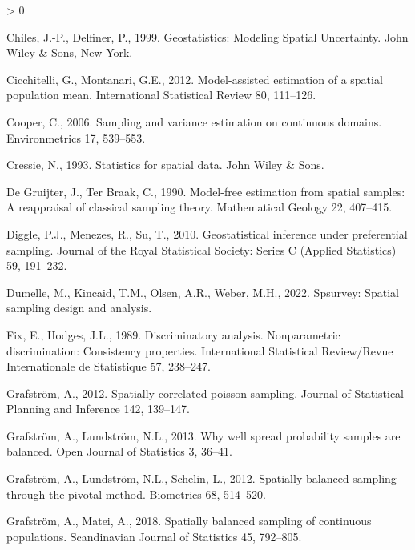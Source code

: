 \documentclass[]{elsarticle} %
\newlength{\cslhangindent}
\newenvironment{CSLReferences}[2] %
 {%
  \setlength{\parindent}{0pt}
  \ifodd #1 \everypar{\setlength{\hangindent}{\cslhangindent}}\ignorespaces\fi
  \ifnum #2 > 0
  \setlength{\parskip}{#2\baselineskip}
  \fi
 }%
 {}
\begin{document}
\begin{CSLReferences}{1}{0}
\leavevmode\hypertarget{ref-chiles1999geostatistics}{}%
Chiles, J.-P., Delfiner, P., 1999. Geostatistics: {Modeling Spatial
Uncertainty}. {John Wiley \& Sons}, New York.

\leavevmode\hypertarget{ref-cicchitelli2012model}{}%
Cicchitelli, G., Montanari, G.E., 2012. Model-assisted estimation of a
spatial population mean. International Statistical Review 80, 111--126.

\leavevmode\hypertarget{ref-cooper2006sampling}{}%
Cooper, C., 2006. Sampling and variance estimation on continuous
domains. Environmetrics 17, 539--553.

\leavevmode\hypertarget{ref-cressie1993statistics}{}%
Cressie, N., 1993. Statistics for spatial data. John Wiley \& Sons.

\leavevmode\hypertarget{ref-de1990model}{}%
De Gruijter, J., Ter Braak, C., 1990. Model-free estimation from spatial
samples: A reappraisal of classical sampling theory. Mathematical
Geology 22, 407--415.

\leavevmode\hypertarget{ref-diggle2010geostatistical}{}%
Diggle, P.J., Menezes, R., Su, T., 2010. Geostatistical inference under
preferential sampling. Journal of the Royal Statistical Society: Series
C (Applied Statistics) 59, 191--232.

\leavevmode\hypertarget{ref-dumelle2022spsurvey}{}%
Dumelle, M., Kincaid, T.M., Olsen, A.R., Weber, M.H., 2022. Spsurvey:
Spatial sampling design and analysis.

\leavevmode\hypertarget{ref-fix1989discriminatory}{}%
Fix, E., Hodges, J.L., 1989. Discriminatory analysis. Nonparametric
discrimination: Consistency properties. International Statistical
Review/Revue Internationale de Statistique 57, 238--247.

\leavevmode\hypertarget{ref-grafstrom2012spatiallypoisson}{}%
Grafström, A., 2012. Spatially correlated poisson sampling. Journal of
Statistical Planning and Inference 142, 139--147.

\leavevmode\hypertarget{ref-grafstrom2013well}{}%
Grafström, A., Lundström, N.L., 2013. Why well spread probability
samples are balanced. Open Journal of Statistics 3, 36--41.

\leavevmode\hypertarget{ref-grafstrom2012spatially}{}%
Grafström, A., Lundström, N.L., Schelin, L., 2012. Spatially balanced
sampling through the pivotal method. Biometrics 68, 514--520.

\leavevmode\hypertarget{ref-grafstrom2018spatially}{}%
Grafström, A., Matei, A., 2018. Spatially balanced sampling of
continuous populations. Scandinavian Journal of Statistics 45, 792--805.


\end{CSLReferences}
\end{document}
